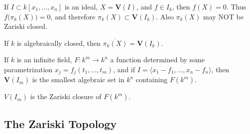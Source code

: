 \documentclass[crop=false,class=book,oneside]{standalone}
\begin{document}
\begin{remark}
If $I\subset k[x_1,\hdots ,x_n]$ is an ideal, $X = \mathbf{V}(I)$, and $f\in I_k$, then $f(X) = 0$. Thus $f\big(\pi_{k}(X)\big)=0$, and therefore $\pi_{k}(X) \subset \mathbf{V}(I_k)$. Also $\pi_{k}(X)$ may NOT be Zariski closed.
\end{remark}
\begin{theorem}
If $k$ is algebraically closed, then $\overline{\pi_k(X)}=\mathbf{V}(I_k)$.
\end{theorem}
\begin{theorem}
If $k$ is an infinite field, $F:k^m \rightarrow k^n$ a function determined by some parametrization $x_j = f_j(t_1,\hdots, t_m)$, and if $I = \langle x_1-f_1,\hdots, x_n-f_n\rangle$, then $\mathbf{V}(I_m)$ is the smallest algebraic set in $k^n$ containing $F(k^m)$.
\end{theorem}
\begin{remark}
$V(I_m)$ is the Zariski closure of $F(k^m)$.
\end{remark}
\subsection{The Zariski Topology}
\end{document}
